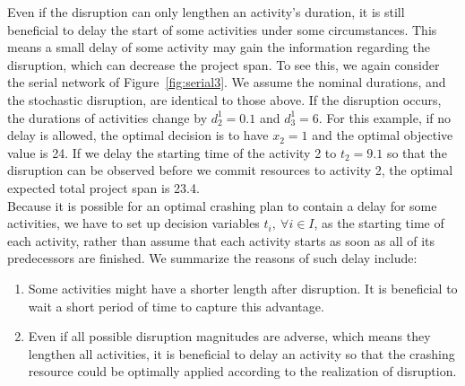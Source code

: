 \documentclass[11pt]{article}
\begin{document}
	\newline
	Even if the disruption can only lengthen an activity's duration, it is still beneficial to delay the start of some activities under some circumstances. This means a small delay of some activity may gain the information regarding the disruption, which can decrease the project span. To see this, we again consider the serial network of Figure~\ref{fig:serial3}. We assume the nominal durations, and the stochastic disruption, are identical to those above. If the disruption occurs, the durations of activities change by \(d_2^1=0.1\) and \(d_3^1 = 6\). For this example, if no delay is allowed, the optimal decision is to have \(x_2 = 1\) and the optimal objective value is 24. If we delay the starting time of the activity 2 to \(t_2 = 9.1\) so that the disruption can be observed before we commit resources to activity 2, the optimal expected total project span is 23.4. \\
	\newline
	Because it is possible for an optimal crashing plan to contain a delay for some activities, we have to set up decision variables \(t_i,\ \forall i \in I\), as the starting time of each activity, rather than assume that each activity starts as soon as all of its predecessors are finished.  We summarize the reasons of such delay include:
		\begin{enumerate}
			\item Some activities might have a shorter length after disruption. It is beneficial to wait a short period of time to capture this advantage.
			\item Even if all possible disruption magnitudes are adverse, which means they lengthen all activities, it is beneficial to delay an activity so that the crashing resource could be optimally applied according to the realization of disruption.
		\end{enumerate}
\end{document}
